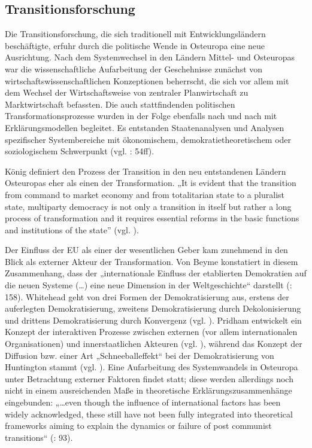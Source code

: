 \subsection{Transitionsforschung}
Die Transitionsforschung, die sich traditionell mit Entwicklungsländern beschäftigte, erfuhr durch die politische Wende in Osteuropa eine neue Ausrichtung. Nach dem Systemwechsel in den Ländern Mittel- und Osteuropas war die wissenschaftliche Aufarbeitung der Geschehnisse zunächst von wirtschaftswissenschaftlichen Konzeptionen beherrscht, die sich vor allem mit dem Wechsel der Wirtschaftsweise von zentraler Planwirtschaft zu Marktwirtschaft befassten. Die auch stattfindenden politischen Transformationsprozesse wurden in der Folge ebenfalls nach und nach mit Erklärungsmodellen begleitet. Es entstanden Staatenanalysen und Analysen spezifischer Systembereiche mit ökonomischem, demokratietheoretischem oder soziologischem Schwerpunkt (vgl. \cite{huszak}: 54ff).\par
König definiert den Prozess der Transition in den neu entstandenen Ländern Osteuropas eher als einen der Transformation. „It is evident that the transition from command to market economy and from totalitarian state to a pluralist state, multiparty democracy is not only a transition in itself but rather a long process of transformation and it requires essential reforms in the basic functions and institutions of the state” (vgl. \cite{koenig}). \par
Der Einfluss der EU als einer der wesentlichen Geber kam zunehmend in den Blick als externer Akteur der Transformation. Von Beyme konstatiert in diesem Zusammenhang, dass der „internationale Einfluss der etablierten Demokratien auf die neuen Systeme (…) eine neue Dimension in der Weltgeschichte“ darstellt (\cite{beyme}: 158). Whitehead geht von drei Formen der Demokratisierung aus, erstens der auferlegten Demokratisierung, zweitens Demokratisierung durch Dekolonisierung und drittens Demokratisierung durch Konvergenz (vgl. \cite{whitehead}). Pridham entwickelt ein Konzept der interaktiven Prozesse zwischen externen (vor allem internationalen Organisationen) und innerstaatlichen Akteuren (vgl. \cite{pridham91,pridham95,pridham08}), während das Konzept der Diffusion bzw. einer Art „Schneeballeffekt“ bei der Demokratisierung von Huntington stammt (vgl. \cite{hunting}). Eine Aufarbeitung des Systemwandels in Osteuropa unter Betrachtung externer Faktoren findet statt; diese werden allerdings noch nicht in einem ausreichenden Maße in theoretische Erklärungszusammenhänge eingebunden: „…even though the influence of international factors has been widely acknowledged, these still have not been fully integrated into theoretical frameworks aiming to explain the dynamics or failure of post communist transitions“ (\cite{dimpri}: 93).\par
